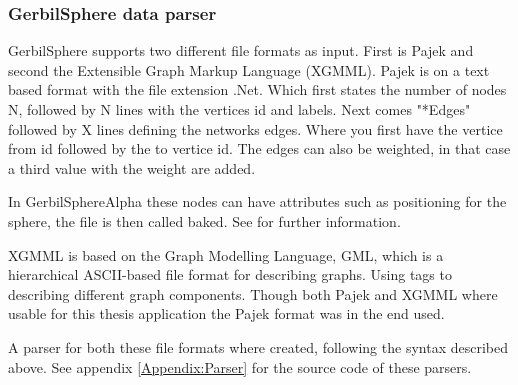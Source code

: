\documentclass[a4paper,11pt]{kth-mag}
\begin{document}
\begin{appendices}
\subsubsection{GerbilSphere data parser}
GerbilSphere supports two different file formats as input. First is Pajek\cite{website:gephipajek} and second the Extensible Graph Markup Language (XGMML)\cite{website:xgmml}. Pajek is on a text based format with the file 
extension .Net. Which first states the number of nodes N, followed by N lines with the vertices id and labels. Next comes "*Edges" followed by X lines defining the networks edges. Where you first have the vertice from id
followed by the to vertice id. The edges can also be weighted, in that case a third value with the weight are added. 

In GerbilSphereAlpha these nodes can have attributes such as positioning for the sphere, the file is then called baked. See \cite{Shelley20121016} for further information.

XGMML is based on the Graph Modelling Language, GML, which is a hierarchical ASCII-based file format for describing graphs. Using tags to describing different graph components.
Though both Pajek and XGMML where usable for this thesis application the Pajek format was in the end used.

A parser for both these file formats where created, following the syntax described above. See appendix \ref{Appendix:Parser} for the source code of these parsers.
\end{appendices}

\nocite{*}\\

\renewcommand{\bibname}{References}
%

\end{document}
